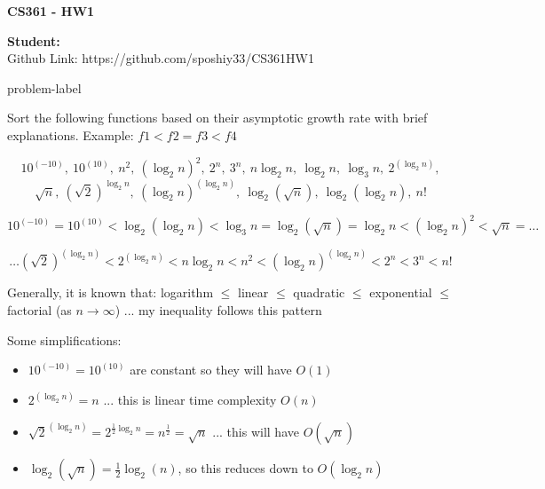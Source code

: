 \documentclass[letterpaper, 11pt]{extarticle}
\begin{document}
\begin{Large}
    \textsf{\textbf{CS361 - HW1}}
\end{Large}

\vspace{1ex}

\textsf{\textbf{Student:}} \\

Github Link: https://github.com/sposhiy33/CS361HW1

\vspace{2ex}


\begin{problem}{}{problem-label}

    Sort the following functions based on their asymptotic growth rate with brief explanations. Example: $f1 < f2 = f3 < f4$
    
    \[
    10^{(-10)}, \ 10^{(10)}, \ n^2, \ (\log_2 n)^2, \ 2^n, \ 3^n, \ n \log_2 n, \ \log_2 n, \ \log_3 n, \ 2^{(\log_2 n)},
    \]
    \[
    \sqrt{n}, \ (\sqrt{2})^{\log_2 n}, \ (\log_2 n)^{(\log_2 n)}, \ \log_2(\sqrt{n}), \ \log_2(\log_2 n), \ n!
    \]

\end{problem}

\[ 
10^{(-10)} = 10^{(10)} <
\log_2(\log_2 n) <
\log_3 n = 
\log_2(\sqrt{n}) = \log_2 n <
(\log_2 n)^2 <
\sqrt{n} = 
\ldots \]

\[ \ldots
(\sqrt{2})^{(\log_2 n)} <
2^{(\log_2 n)} <
n \log_2 n <
n^2 <
(\log_2 n)^{(\log_2 n)} <
2^n <
3^n <
n! \]

Generally, it is known that: logarithm $\leq$ linear $\leq$ quadratic $\leq$ exponential $\leq$ factorial (as $n \rightarrow \infty$) ... my inequality follows this pattern

Some simplifications:
\begin{itemize}
    \item $ 10^{(-10)} = 10^{(10)} $  are constant so they will have $O(1)$
    
    \item $2^{(\log_2 n)} = n$ ... this is linear time complexity $O(n)$
    
    \item  $\sqrt{2}^{(\log_2 n)} = 2^{\frac{1}{2}\log_2 n} = n^{\frac{1}{2}} = \sqrt{n}$ ... this will have $O(\sqrt{n})$
    
    \item $\log_2(\sqrt{n}) = \frac{1}{2}\log_2(n)$, so this reduces down to $O(\log_2 n)$
    
\end{itemize}
\end{document}
